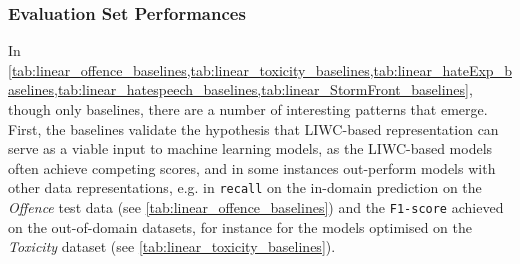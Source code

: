 \subsubsection{Evaluation Set Performances}  
In \cref{tab:linear_offence_baselines,tab:linear_toxicity_baselines,tab:linear_hateExp_baselines,tab:linear_hatespeech_baselines,tab:linear_StormFront_baselines}, though only baselines, there are a number of interesting patterns that emerge.  
First, the baselines validate the hypothesis that LIWC-based representation can serve as a viable input to machine learning models, as the LIWC-based models often achieve competing scores, and in some instances out-perform models with other data representations, e.g. in \texttt{recall} on the in-domain prediction on the \textit{Offence} test data (see \cref{tab:linear_offence_baselines}) and the \texttt{F1-score} achieved on the out-of-domain datasets, for instance for the models optimised on the \textit{Toxicity} dataset (see \cref{tab:linear_toxicity_baselines}).  
